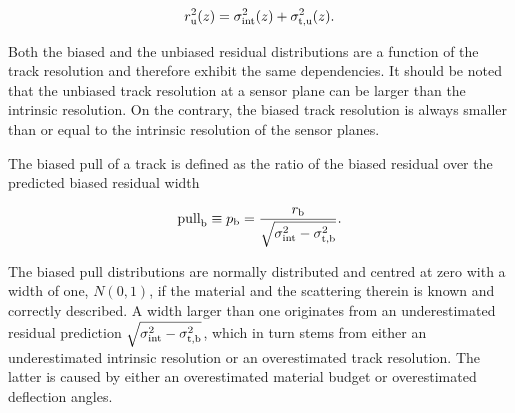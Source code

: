 \begin{equation}
r_{\textrm{u}}^2(z) = \sigma_{\textrm{int}}^2(z) + \sigma_{\textrm{t,u}}^2(z).
\label{eq:telescoperesolutionequation2} 
\end{equation}

\noindent
Both the biased and the unbiased residual distributions are a function of the track resolution and therefore exhibit the same dependencies.
It should be noted that the unbiased track resolution at a sensor plane can be larger than the intrinsic resolution. 
On the contrary, the biased track resolution is always smaller than or equal to the intrinsic resolution of the sensor planes. 

The biased pull of a track is defined as the ratio of the biased residual over the predicted biased residual width

\begin{equation}
 \textrm{pull}_{\textrm{b}} \equiv p_{\textrm{b}} = \frac{r_{\textrm{b}}}{\sqrt{\sigma_{\textrm{int}}^2 - \sigma_{\textrm{t,b}}^2}}.
 \label{eq:pull}
\end{equation}

\noindent
The biased pull distributions are normally distributed and centred at zero with a width of one, $N(0,1)$, if the material and the scattering therein is known and correctly described. 
A width larger than one originates from an underestimated residual prediction $\sqrt{\sigma_{\textrm{int}}^2 - \sigma_{\textrm{t,b}}^2}$, which in turn stems from either an underestimated intrinsic resolution
 or an overestimated track resolution. 
The latter is caused by either an overestimated material budget or overestimated deflection angles. 

